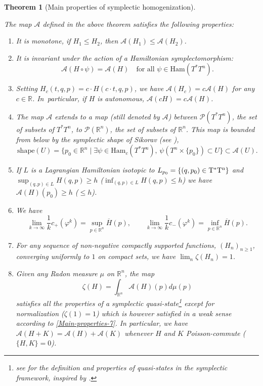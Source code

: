 \documentclass[JEP,XML,SOM,NoFloatCountersInSection,Unicode,published]{cedram}
\numberwithin{equation}{section}
\newcommand {\DHam}{\mathrm{Ham}}
\theoremstyle{plain}
\newtheorem{theorem}{Theorem}[section]
\theoremstyle{definition}
\theoremstyle{remark}
\begin{document}
\begin{theorem}[Main properties of symplectic homogenization] \label{Main-properties}

The map $\mathcal A$ defined in the above theorem satisfies the following properties:
\begin{enumerate}
\item \label{Main-properties-1}It is monotone, \ie if $H_1 \leq H_2$, then ${\mathcal A}(H_1) \leq {\mathcal A}(H_2)$.

\item \label{Main-properties-2} It is invariant under the action of a Hamiltonian symplectomorphism:
\[
{\mathcal{A}} (H\circ \psi)= {\mathcal{A}}(H)\quad\text{for all }\psi \in \DHam (T^*T^n).
\]

\item \label{Main-properties-3} Setting $H_c(t,q,p)=c\cdot H(c\cdot t, q,p)$, we have ${\mathcal A}(H_c)=c{\mathcal A} (H)$ for any $c\in {\mathbb R}$. In~particular, if $H$ is autonomous, $\mathcal A (c H)= c \mathcal A(H)$.
\item \label{Main-properties-4} The map $\mathcal{A}$ extends to a map (still denoted by $\mathcal{A}$) between ${\mathcal P}(T^*T^n)$, the set of subsets of $T^*T^n$, to $ {\mathcal P}({\mathbb R}^n)$, the set of subsets of ${\mathbb R}^n$. This map is bounded from below by the symplectic shape of Sikorav (see \cite{Benci, Sikorav,Eliashberg}), \ie
\[
\mathrm{shape}(U)=\{p_0\in {\mathbb R}^n \mid \exists \psi \in\DHam_c (T^{*} T^{n}),\,\psi(T^n\times \{p_0\}) \subset U \}
\subset {\mathcal{A}}(U).
\]
\item \label{Main-properties-5} If $L$ is a Lagrangian Hamiltonian isotopic to $L_{p_{0}}=\{(q,p_{0})\in {\rm T^*T^{n}}\} $ and $\sup_{(q,p)\in L} H(q,p)\!\geq\!h$ (\resp $\inf_{(q,p)\in L} H(q,p)\!\leq\! h$) we have ${\mathcal A}(H)(p_{0})\!\geq\! h$ (\resp \hbox{$\leq\!h$}).
\item \label{Main-properties-6} We have
\[
\lim_{k\to \infty} \frac{1}{k} c_{+}(\varphi ^k)= \sup_{p\in {\mathbb R} ^n} {\overline H}(p),\qquad \lim_{k\to \infty} \frac{1}{k} c_{-}(\varphi ^k) =\inf_{p\in {\mathbb R} ^n} {\overline H}(p).
\]
\item \label{Main-properties-7} For any sequence of non-negative compactly supported functions, $(H_n)_{n\geq 1}$, converging uniformly to $1$ on compact sets, we have $\lim_{n}\zeta (H_{n})=1$.

\item \label{Main-properties-8} Given any Radon measure $\mu$ on ${\mathbb R}^n$, the map
\[
\zeta (H)= \int_{{\mathbb R}^n} {\mathcal{A}}(H)(p) d\mu(p)
\]
satisfies all the properties of a \emph{symplectic quasi-state}\footnote{see \cite{E-P} for the definition and properties of quasi-states in the symplectic framework, inspired by \cite{Aarnes}.} except for normalization (\ie $\zeta(1)=1$) which is however satisfied in a weak sense according to \ref{Main-properties-7}. In particular, we have ${\mathcal A}(H+K) ={\mathcal A}(H)+ {\mathcal A}(K)$ whenever $H$ and $K$ Poisson-commute (\ie $\{H,K\}=0$).
\end{enumerate}
\end{theorem}
\end{document}
